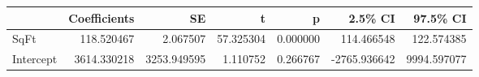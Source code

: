 \begin{tabular}{lrrrrrr}
\toprule
{} &  Coefficients &           SE &          t &         p &      2.5\% CI &     97.5\% CI \\
\midrule
SqFt      &    118.520467 &     2.067507 &  57.325304 &  0.000000 &   114.466548 &   122.574385 \\
Intercept &   3614.330218 &  3253.949595 &   1.110752 &  0.266767 & -2765.936642 &  9994.597077 \\
\bottomrule
\end{tabular}
